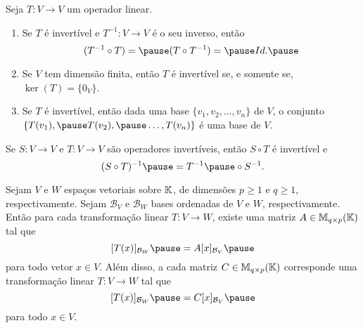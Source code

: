 \documentclass{beamer}
\begin{document}
    \begin{frame}
        \begin{proposicao}
            Seja $T \colon V \to V$ um operador linear.\pause
            \begin{enumerate}[label={\roman*})]
                \item Se $T$ é invertível \pause e $T^{-1} \colon V \to V$ é o seu inverso, \pause então
                    \[
                        (T^{-1} \circ T) = \pause (T \circ T^{-1}) = \pause Id.\pause
                    \]

                \vspace{.5cm}

                \item Se $V$ tem dimensão finita, \pause então $T$ é invertível \pause se, e somente se, \pause $\ker(T) = \{0_V\}$.\pause

                \vspace{.5cm}

                \item Se $T$ é invertível, \pause então dada uma base $\{v_1, v_2, \dots, v_n\}$ de $V$, \pause o conjunto $\{T(v_1), \pause
                    T(v_2), \pause \dots, T(v_n)\}$ \pause é uma base de $V$.
            \end{enumerate}
        \end{proposicao}
    \end{frame}

    \begin{frame}
        \begin{proposicao}
            Se $S \colon V \to V$ e $T \colon V \to V$ \pause são operadores invertíveis, \pause então $S \circ T$ é invertível e\pause
            \[
                (S \circ T)^{-1} \pause = T^{-1} \pause \circ S^{-1}.
            \]
        \end{proposicao}
    \end{frame}

    \begin{frame}
        \begin{teorema}
            Sejam $V$ e $W$ espaços vetoriais sobre $\mathbb{K}$, \pause de dimensões $p \ge 1$ e $q \ge 1$, respectivamente. \pause Sejam
            $\mathcal{B}_V$ e $\mathcal{B}_W$ bases ordenadas de $V$ e $W$, respectivamente. \pause Então para cada transformação linear
            $T \colon V \to W$, \pause existe uma matriz $A \in \mathbb{M}_{q\times p}(\mathbb{K})$ tal que\pause
            \[
                [T(x)]_{\mathcal{B}_W} \pause = A[x]_{\mathcal{B}_V}\pause
            \]
            para todo vetor $x \in V$. \pause Além disso, \pause a cada matriz $C \in \mathbb{M}_{q\times p}(\mathbb{K})$ \pause corresponde uma
            transformação linear $T \colon V \to W$ tal que\pause
            \[
                [T(x)]_{\mathcal{B}_W} \pause = C[x]_{\mathcal{B}_V}\pause
            \]
            para todo $x \in V$.
        \end{teorema}
    \end{frame}
\end{document}
